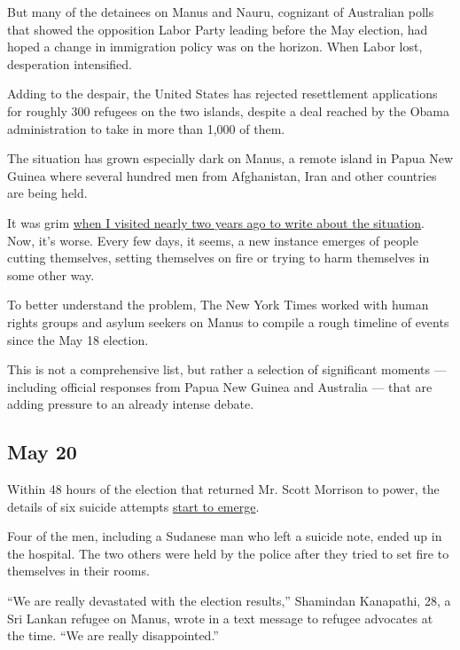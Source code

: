 But many of the detainees on Manus and Nauru, cognizant of Australian
polls that showed the opposition Labor Party leading before the May
election, had hoped a change in immigration policy was on the horizon.
When Labor lost, desperation intensified.

Adding to the despair, the United States has rejected resettlement
applications for roughly 300 refugees on the two islands, despite a deal
reached by the Obama administration to take in more than 1,000 of them.

The situation has grown especially dark on Manus, a remote island in
Papua New Guinea where several hundred men from Afghanistan, Iran and
other countries are being held.

It was grim
\href{https://www.nytimes.com/interactive/2017/11/18/world/australia/manus-island-australia-detainees.html?_r=0}{when
I visited nearly two years ago to write about the situation}. Now, it's
worse. Every few days, it seems, a new instance emerges of people
cutting themselves, setting themselves on fire or trying to harm
themselves in some other way.

To better understand the problem, The New York Times worked with human
rights groups and asylum seekers on Manus to compile a rough timeline of
events since the May 18 election.

This is not a comprehensive list, but rather a selection of significant
moments --- including official responses from Papua New Guinea and
Australia --- that are adding pressure to an already intense debate.

\hypertarget{may-20}{%
\subsection{May 20}\label{may-20}}

Within 48 hours of the election that returned Mr. Scott Morrison to
power, the details of six suicide attempts
\href{https://twitter.com/BehrouzBoochani/status/1130424427139674112?s=20}{start
to emerge}.

Four of the men, including a Sudanese man who left a suicide note, ended
up in the hospital. The two others were held by the police after they
tried to set fire to themselves in their rooms.

``We are really devastated with the election results,'' Shamindan
Kanapathi, 28, a Sri Lankan refugee on Manus, wrote in a text message to
refugee advocates at the time. ``We are really disappointed.''


